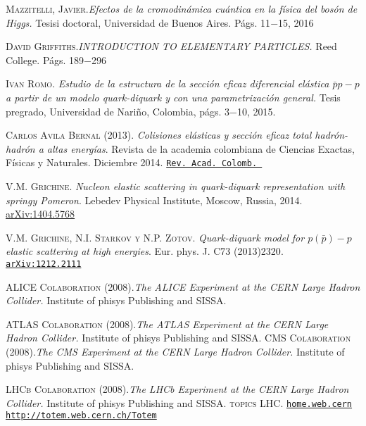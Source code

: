 \begin{thebibliography}{}
 \textsc{Mazzitelli, Javier}.\textit{Efectos de la cromodin\'amica cu\'antica en la f\'isica
del bos\'on de Higgs.}
\textup{Tesisi doctoral, Universidad de Buenos Aires. P\'ags. 11$-$15, 2016}

 \textsc{David Griffiths}.\textit{INTRODUCTION TO ELEMENTARY PARTICLES.}
\textup{Reed College. P\'ags. 189$-$296}

 \textsc{Ivan Romo}. \textit{Estudio de la estructura de la secci\'on eficaz diferencial el\'astica $\bar{p}p-p$ a partir de un modelo quark-diquark y con una parametrizaci\'on general.}
\textup{Tesis pregrado, Universidad de Nari\~no, Colombia}, p\'ags. 3$-$10, 2015.

 \textsc{Carlos Avila Bernal (2013).} \textit{Colisiones el\'asticas y secci\'on eficaz total hadr\'on-hadr\'on a altas energ\'ias}.
\textup{Revista de la academia colombiana de Ciencias Exactas, F\'isicas y Naturales. Diciembre 2014. }\href{https://www.raccefyn.co/index.php/raccefyn/article/viewFile/151/62}{\texttt{Rev. Acad. Colomb. }}

  \textsc{V.M. Grichine.}
 \textit{Nucleon elastic scattering in quark-diquark representation with
springy Pomeron}. \textup{Lebedev Physical Institute, Moscow, Russia, 2014}.\\
 \href{https://arxiv.org/abs/1404.5768v1}{arXiv:1404.5768}
 
  \textsc{V.M. Grichine, N.I. Starkov y N.P. Zotov.}
 \textit{Quark-diquark model for $p(\bar{p})-p$ elastic scattering at high
energies}. \textup{Eur. phys. J. C73 (2013)2320}.\\
 \href{http://lanl.arxiv.org/abs/1212.2111v2}{\texttt{arXiv:1212.2111}}

 \textsc{ALICE Colaboration (2008)}.\textit{The ALICE Experiment at the CERN Large Hadron Collider.}
\textup{Institute of phisys Publishing and SISSA.}

 \textsc{ATLAS Colaboration (2008)}.\textit{The ATLAS Experiment at the CERN Large Hadron Collider.}
\textup{Institute of phisys Publishing and SISSA.}
 \textsc{CMS Colaboration (2008)}.\textit{The CMS Experiment at the CERN Large Hadron Collider.}
\textup{Institute of phisys Publishing and SISSA.}

 \textsc{LHC\textup{b} Colaboration (2008)}.\textit{The LHC\textup{b} Experiment at the CERN Large Hadron Collider.}
\textup{Institute of phisys Publishing and SISSA.}
 \textsc{topics LHC}. \href{http://home.web.cern.ch/ ,28-07-2017}{\texttt{home.web.cern}}
 \href{http://totem.web.cern.ch/Totem}{\texttt{http://totem.web.cern.ch/Totem}} 



\end{thebibliography}
